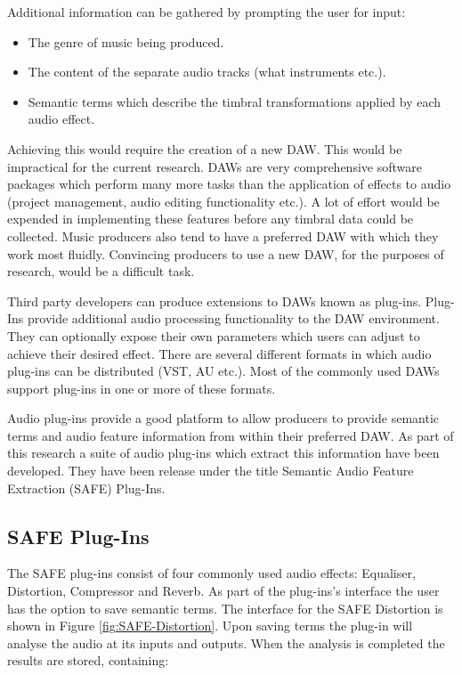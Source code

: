 		Additional information can be gathered by prompting the user for input:

		\begin{itemize}
			\item The genre of music being produced.
			\item The content of the separate audio tracks (what instruments etc.).
			\item Semantic terms which describe the timbral transformations applied by each audio
			      effect.
		\end{itemize}

		Achieving this would require the creation of a new DAW. This would be impractical for the current research.
		DAWs are very comprehensive software packages which perform many more tasks than the application of effects
		to audio (project management, audio editing functionality etc.). A lot of effort would be expended in
		implementing these features before any timbral data could be collected.  Music producers also tend to have a
		preferred DAW with which they work most fluidly. Convincing producers to use a new DAW, for the purposes of
		research, would be a difficult task.

		Third party developers can produce extensions to DAWs known as plug-ins. Plug-Ins provide additional audio
		processing functionality to the DAW environment. They can optionally expose their own parameters which users
		can adjust to achieve their desired effect. There are several different formats in which audio plug-ins can
		be distributed (VST, AU etc.). Most of the commonly used DAWs support plug-ins in one or more of these
		formats.

		Audio plug-ins provide a good platform to allow producers to provide semantic terms and audio feature
		information from within their preferred DAW. As part of this research a suite of audio plug-ins which
		extract this information have been developed. They have been release under the title Semantic Audio Feature
		Extraction (SAFE) Plug-Ins.

	\subsection{SAFE Plug-Ins}
		The SAFE plug-ins consist of four commonly used audio effects: Equaliser, Distortion, Compressor and Reverb.
		As part of the plug-ins's interface the user has the option to save semantic terms. The interface for the
		SAFE Distortion is shown in Figure \ref{fig:SAFE-Distortion}. Upon saving terms the plug-in will analyse the
		audio at its inputs and outputs. When the analysis is completed the results are stored, containing:

